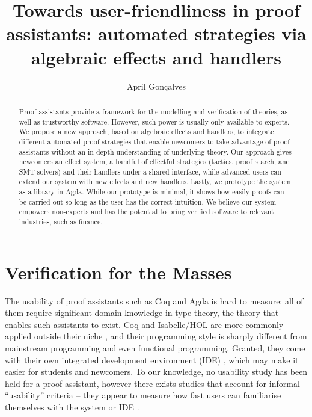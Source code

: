 \documentclass[sigconfl]{acmart}
\begin{document}
\title[Towards user-friendliness in proof assistants]{Towards user-friendliness
  in proof assistants: automated strategies \textbf{via} algebraic effects and handlers}

\author{April Gonçalves}

\renewcommand{\shortauthors}{April Gonçalves}

\begin{abstract}
Proof assistants provide a framework for the modelling and verification of
theories, as well as trustworthy software. However, such power is usually only
available to experts. We propose a new approach, based on algebraic effects and
handlers, to integrate different automated proof strategies that enable
newcomers to take advantage of proof assistants without an in-depth
understanding of underlying theory. Our approach gives newcomers an effect
system, a handful of effectful strategies (tactics, proof search, and SMT
solvers) and their handlers under a shared interface, while advanced users can
extend our system with new effects and new handlers. Lastly, we prototype the
system as a library in Agda. While our prototype is minimal, it shows how easily
proofs can be carried out so long as the user has the correct intuition. We
believe our system empowers non-experts and has the potential to bring verified
software to relevant industries, such as finance.
\end{abstract}


\maketitle

\section{Verification for the Masses}

The usability of proof assistants such as Coq \cite{DBLP:journals/corr/abs-cs-0603118} and Agda
\cite{DBLP:conf/tldi/Norell09} is
hard to measure: all of them require significant domain knowledge in type
theory, the theory that enables such assistants to exist. Coq and Isabelle/HOL
are more commonly applied outside their niche
\cite{DBLP:journals/corr/abs-1907-10674, peltier:hal-01562944}, and their programming style is
sharply different from
mainstream programming and even functional programming. Granted, they come with
their own integrated development environment (IDE)
\cite{DBLP:journals/sttt/FaithfullBTT18, DBLP:conf/itp/RoeS16}, which may make it easier for
students and newcomers. To our knowledge, no usability study has been
held for a proof assistant, however there exists studies that account for
informal ``usability'' criteria -- they appear to measure how fast users can
familiarise themselves with the system or IDE \cite{Wiedijk2003,
  DBLP:journals/corr/abs-1808-09701}.
\end{document}
